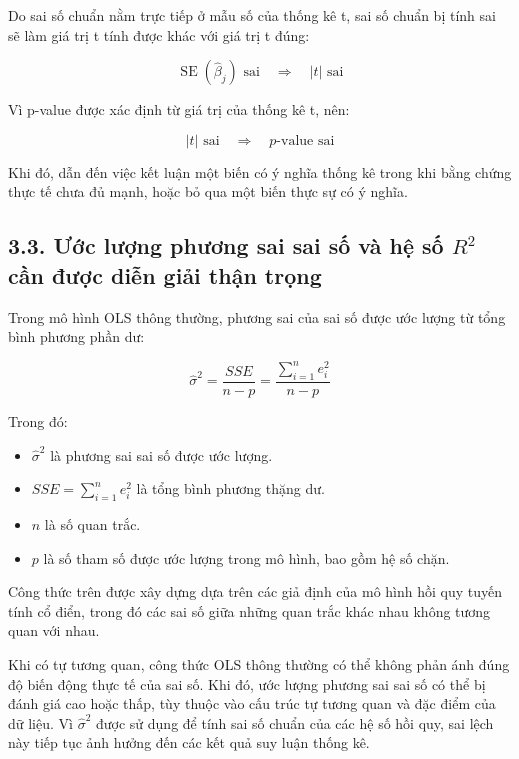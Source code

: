 \documentclass[12pt,a4paper]{article}
\begin{document}
Do sai số chuẩn nằm trực tiếp ở mẫu số của thống kê t, sai số chuẩn bị tính sai sẽ làm giá trị t tính được khác với giá trị t đúng:

\[
\widehat{\operatorname{SE}}(\hat{\beta}_j)
\text{ sai}
\quad \Rightarrow \quad
|t|
\text{ sai}
\]

Vì p-value được xác định từ giá trị của thống kê t, nên:

\[
|t|
\text{ sai}
\quad \Rightarrow \quad
p\text{-value sai}
\]

Khi đó, dẫn đến việc kết luận một biến có ý nghĩa thống kê trong khi bằng chứng thực tế chưa đủ mạnh, hoặc bỏ qua một biến thực sự có ý nghĩa.


\subsection{3.3. Ước lượng phương sai sai số và hệ số $R^2$ cần được diễn giải thận trọng}

Trong mô hình OLS thông thường, phương sai của sai số được ước lượng từ tổng bình phương phần dư:

\[
\hat{\sigma}^2
=
\frac{SSE}{n-p}
=
\frac{\sum_{i=1}^{n}e_i^2}{n-p}
\]

Trong đó:

\begin{itemize}
    \item $\hat{\sigma}^2$ là phương sai sai số được ước lượng.
    
    \item $SSE=\sum_{i=1}^{n}e_i^2$ là tổng bình phương thặng dư.
    
    \item $n$ là số quan trắc.
    
    \item $p$ là số tham số được ước lượng trong mô hình, bao gồm hệ số chặn.
\end{itemize}

Công thức trên được xây dựng dựa trên các giả định của mô hình hồi quy tuyến tính cổ điển, trong đó các sai số giữa những quan trắc khác nhau không tương quan với nhau.

Khi có tự tương quan, công thức OLS thông thường có thể không phản ánh đúng độ biến động thực tế của sai số. Khi đó, ước lượng phương sai sai số có thể bị đánh giá cao hoặc thấp, tùy thuộc vào cấu trúc tự tương quan và đặc điểm của dữ liệu. Vì $\hat{\sigma}^2$ được sử dụng để tính sai số chuẩn của các hệ số hồi quy, sai lệch này tiếp tục ảnh hưởng đến các kết quả suy luận thống kê.
\end{document}
